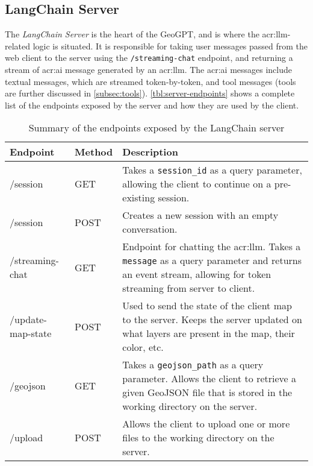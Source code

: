 \subsection{LangChain Server}\label{subsec:langchain-server}
\label{subsec:langchain-server-architecture}

The \textit{LangChain Server} is the heart of the GeoGPT, and is where the \gls{acr:llm}-related logic is situated. It is responsible for taking user messages passed from the web client to the server using the \texttt{/streaming-chat} endpoint, and returning a stream of \acrshort{acr:ai} message generated by an \acrshort{acr:llm}. The \acrshort{acr:ai} messages include textual messages, which are streamed token-by-token, and tool messages (tools are further discussed in \autoref{subsec:tools}). \autoref{tbl:server-endpoints} shows a complete list of the endpoints exposed by the server and how they are used by the client.

\begin{table}[H]
    \centering
    \caption[API endpoints exposed by GeoGPT's LangChain server]{Summary of the endpoints exposed by the LangChain server}
    \label{tbl:server-endpoints}
    \begin{tabular}{p{}p{}p{}}
        \toprule
        \textbf{Endpoint} & \textbf{Method} & \textbf{Description}                                                                                                                                                         \\
        \midrule
        /session          & GET             & Takes a \texttt{session\_id} as a query parameter, allowing the client to continue on a pre-existing session.                                                                \\
        /session          & POST            & Creates a new session with an empty conversation.                                                                                                                            \\
        /streaming-chat   & GET             & Endpoint for chatting the \acrshort{acr:llm}. Takes a \texttt{message} as a query parameter and returns an event stream, allowing for token streaming from server to client. \\
        /update-map-state & POST            & Used to send the state of the client map to the server. Keeps the server updated on what layers are present in the map, their color, etc.                                    \\
        /geojson          & GET             & Takes a \texttt{geojson\_path} as a query parameter. Allows the client to retrieve a given GeoJSON file that is stored in the working directory on the server.               \\
        /upload           & POST            & Allows the client to upload one or more files to the working directory on the server.                                                                                        \\
        \bottomrule
    \end{tabular}
\end{table}

